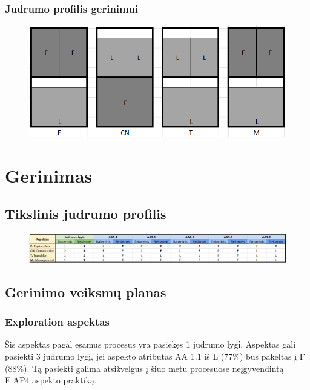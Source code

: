 \documentclass{article}
\begin{document}
\subsubsection{Judrumo profilis gerinimui}

\begin{figure}[h]
    \centering
    \includegraphics[width=0.75\linewidth]{task-2/images/blokai.png}
    \label{fig:enter-label}
\end{figure}

\section{Gerinimas}

\subsection{Tikslinis judrumo profilis}

\begin{figure}[h]
    \centering
    \includegraphics[width=0.75\linewidth]{task-2/images/tikslinis-profilis.png}
    \label{fig:enter-label}
\end{figure}

\subsection{Gerinimo veiksmų planas}



\subsubsection{Exploration aspektas}

Šis aspektas pagal esamus procesus yra pasiekęs 1 judrumo lygį. Aspektas gali pasiekti 3 judrumo lygį, jei aspekto atributas
AA 1.1 iš L (77\%) bus pakeltas į F (88\%). Tą pasiekti galima atsižvelgus į šiuo metu procesuose neįgyvendintą E.AP4 aspekto praktiką.
\end{document}
